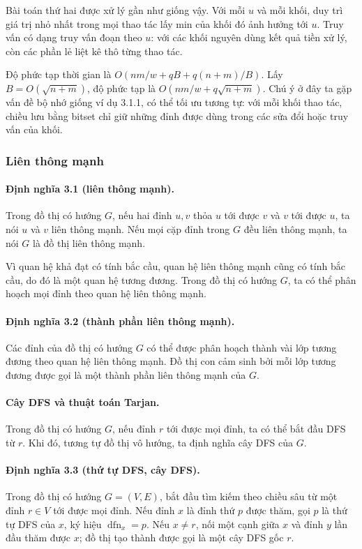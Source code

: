 \documentclass[11pt]{article}
\begin{document}
Bài toán thứ hai được xử lý gần như giống vậy. Với mỗi $u$ và mỗi khối, duy trì
giá trị nhỏ nhất trong mọi thao tác lấy min của khối đó ảnh hưởng tới $u$. Truy
vấn có dạng truy vấn đoạn theo $u$: với các khối nguyên dùng kết quả tiền xử lý,
còn các phần lẻ liệt kê thô từng thao tác.

Độ phức tạp thời gian là
$O(nm/w+qB+q(n+m)/B)$. Lấy $B=O(\sqrt{n+m})$, độ phức tạp là
$O(nm/w+q\sqrt{n+m})$. Chú ý ở đây ta gặp vấn đề bộ nhớ giống ví dụ 3.1.1, có
thể tối ưu tương tự: với mỗi khối thao tác, chiều lưu bằng bitset chỉ giữ những
đỉnh được dùng trong các sửa đổi hoặc truy vấn của khối.

\subsubsection{Liên thông mạnh}

\paragraph{Định nghĩa 3.1 (liên thông mạnh).}
Trong đồ thị có hướng $G$, nếu hai đỉnh $u,v$ thỏa $u$ tới được $v$ và $v$ tới
được $u$, ta nói $u$ và $v$ liên thông mạnh. Nếu mọi cặp đỉnh trong $G$ đều liên
thông mạnh, ta nói $G$ là đồ thị liên thông mạnh.

Vì quan hệ khả đạt có tính bắc cầu, quan hệ liên thông mạnh cũng có tính bắc
cầu, do đó là một quan hệ tương đương. Trong đồ thị có hướng $G$, ta có thể phân
hoạch mọi đỉnh theo quan hệ liên thông mạnh.

\paragraph{Định nghĩa 3.2 (thành phần liên thông mạnh).}
Các đỉnh của đồ thị có hướng $G$ có thể được phân hoạch thành vài lớp tương
đương theo quan hệ liên thông mạnh. Đồ thị con cảm sinh bởi mỗi lớp tương đương
được gọi là một thành phần liên thông mạnh của $G$.

\paragraph{Cây DFS và thuật toán Tarjan.}
Trong đồ thị có hướng $G$, nếu đỉnh $r$ tới được mọi đỉnh, ta có thể bắt đầu DFS
từ $r$. Khi đó, tương tự đồ thị vô hướng, ta định nghĩa cây DFS của $G$.

\paragraph{Định nghĩa 3.3 (thứ tự DFS, cây DFS).}
Trong đồ thị có hướng $G=(V,E)$, bắt đầu tìm kiếm theo chiều sâu từ một đỉnh
$r\in V$ tới được mọi đỉnh. Nếu đỉnh $x$ là đỉnh thứ $p$ được thăm, gọi $p$ là
thứ tự DFS của $x$, ký hiệu $\operatorname{dfn}_x=p$. Nếu $x\ne r$, nối một
cạnh giữa $x$ và đỉnh $y$ lần đầu thăm được $x$; đồ thị tạo thành được gọi là
một cây DFS gốc $r$.
\end{document}
